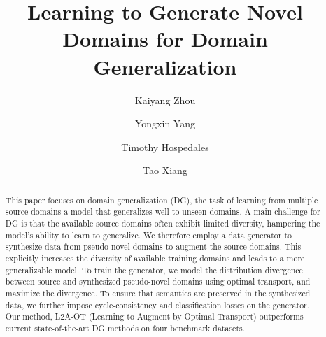 \documentclass[runningheads]{llncs}
\begin{document}
\pagestyle{headings}
\mainmatter
\def\ECCVSubNumber{2595}  

\title{Learning to Generate Novel Domains for Domain Generalization} 

\begin{comment}
\titlerunning{ECCV-20 submission ID \ECCVSubNumber} 
\authorrunning{ECCV-20 submission ID \ECCVSubNumber} 
\author{Anonymous ECCV submission}
\institute{Paper ID \ECCVSubNumber}
\end{comment}


\author{
Kaiyang Zhou \and
Yongxin Yang \and
Timothy Hospedales \and
Tao Xiang
}
\maketitle

\begin{abstract}
This paper focuses on domain generalization (DG), the task of learning from multiple source domains a model that generalizes well to unseen domains. A main challenge for DG is that the available source domains often exhibit limited diversity, hampering the model's ability to learn to generalize. We therefore employ a data generator to synthesize data from pseudo-novel domains to augment the source domains. This explicitly increases the diversity of available training domains and leads to a more generalizable model. To train the generator, we model the distribution divergence between source and synthesized pseudo-novel domains using optimal transport, and maximize the divergence. To ensure that semantics are preserved in the synthesized data, we further impose cycle-consistency and classification losses on the generator. Our method, L2A-OT (Learning to Augment by Optimal Transport) outperforms current state-of-the-art DG methods on four benchmark datasets.
\end{abstract}
\end{document}
